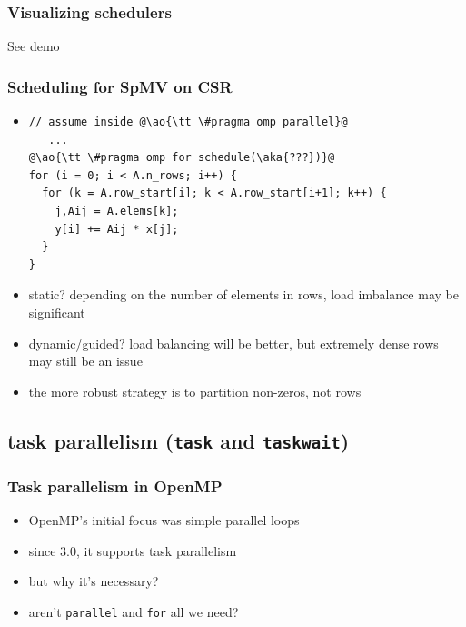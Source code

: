 \documentclass[12pt,dvipdfmx]{beamer}
\newcommand{\ao}[1]{{\color{blue}#1}}
\newcommand{\aka}[1]{{\color{red}#1}}
\begin{document}
\fi

\begin{frame}[fragile]
\frametitle{Visualizing schedulers}
See demo
\end{frame}

\begin{frame}[fragile]
  \frametitle{Scheduling for SpMV on CSR}
  \begin{itemize}
  \item []
\begin{lstlisting}
// assume inside @\ao{\tt \#pragma omp parallel}@
   ...
@\ao{\tt \#pragma omp for schedule(\aka{???})}@
for (i = 0; i < A.n_rows; i++) {
  for (k = A.row_start[i]; k < A.row_start[i+1]; k++) {
    j,Aij = A.elems[k];
    y[i] += Aij * x[j];
  }
}
\end{lstlisting}
\item \ao{static?} depending on the number of elements in rows,
    load imbalance may be significant
 \item \ao{dynamic/guided?} load balancing will be better,
    but extremely dense rows may still be an issue
\item the more robust strategy is to partition non-zeros, not rows
  \end{itemize}
\end{frame}

\subsection{task parallelism ({\tt task} and {\tt taskwait})}

\begin{frame}[fragile]
\frametitle{Task parallelism in OpenMP}
\begin{itemize}
\item OpenMP's initial focus was simple parallel loops
\item since 3.0, it supports task parallelism
\item but why it's necessary?
\item aren't \texttt{parallel} and \texttt{for} all we need?
\end{itemize}
\end{frame}
\end{document}
